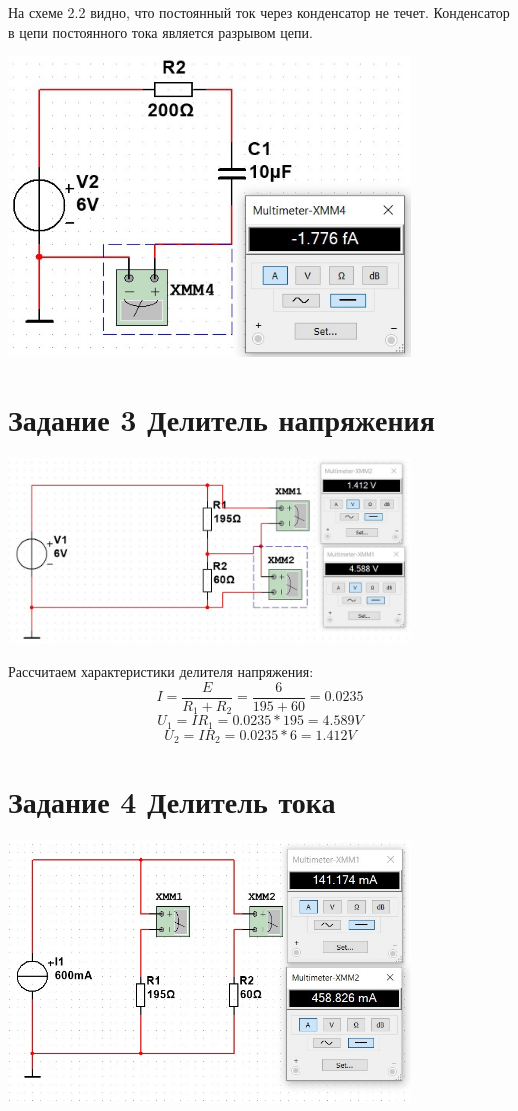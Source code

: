 \documentclass[14pt, a4paper]{article}
\begin{document}
    На схеме 2.2 видно, что постоянный ток через конденсатор не течет.
    Конденсатор в цепи постоянного тока является разрывом цепи.

    {
        \includegraphics[width=0.8\textwidth]{1lab2.2.jpg}
        \centering
    }

    \clearpage


    \section*{Задание 3 Делитель напряжения}

    {
        \includegraphics[width=0.8\textwidth]{1lab3.jpg}
        \centering
    }

    Рассчитаем характеристики делителя напряжения:
    $$I = \frac{E}{R_1 + R_2} = \frac{6}{195+60} = 0.0235$$
    $$U_1 = IR_1 = 0.0235 * 195 = 4.589 V$$
    $$U_2 = IR_2 = 0.0235 * 6 = 1.412 V$$

    \section*{Задание 4 Делитель тока}
    
    {
        \includegraphics[width=0.8\textwidth]{1lab4.jpg}
        \centering
    }
\end{document}
